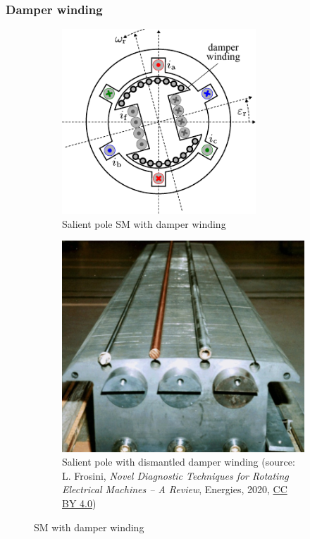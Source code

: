 \begin{frame}
	\frametitle{Damper winding}
	\begin{figure}
		\centering
		\begin{subfigure}{0.49\textwidth}
			\centering
			\includegraphics[width=0.8\textwidth]{fig/lec07/SM_salient_pole_damper_winding.pdf}
			\caption{Salient pole SM with damper winding}
		\end{subfigure}
		\hfill
		\begin{subfigure}{0.49\textwidth}
			\centering
			\includegraphics[height=0.5\textheight]{fig/lec07/Salient_pole_damper_winding.png}
			\caption{Salient pole with dismantled damper winding (source: L. Frosini, \textit{Novel Diagnostic Techniques for Rotating Electrical Machines -- A Review}, Energies, 2020, \href{https://creativecommons.org/licenses/by/4.0/}{CC BY 4.0})} 
		\end{subfigure}
        \caption{SM with damper winding} 
        \label{fig:SM_damper_winding}
	\end{figure}
\end{frame}

